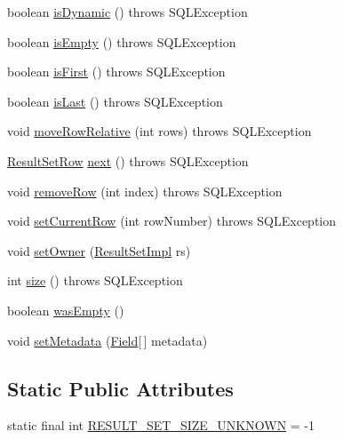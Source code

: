 \begin{DoxyCompactItemize}
\item 
boolean \mbox{\hyperlink{interfacecom_1_1mysql_1_1jdbc_1_1_row_data_a0205c4297c795afb968d714a56272e01}{is\+Dynamic}} ()  throws S\+Q\+L\+Exception
\item 
boolean \mbox{\hyperlink{interfacecom_1_1mysql_1_1jdbc_1_1_row_data_afe25c16468d9db9d9458db7b1c6004f1}{is\+Empty}} ()  throws S\+Q\+L\+Exception
\item 
boolean \mbox{\hyperlink{interfacecom_1_1mysql_1_1jdbc_1_1_row_data_a4bcee2924cecb7f100d887963d6b5b70}{is\+First}} ()  throws S\+Q\+L\+Exception
\item 
boolean \mbox{\hyperlink{interfacecom_1_1mysql_1_1jdbc_1_1_row_data_a372c70885e7272deb3ad84fefb75eebb}{is\+Last}} ()  throws S\+Q\+L\+Exception
\item 
void \mbox{\hyperlink{interfacecom_1_1mysql_1_1jdbc_1_1_row_data_ad0ef1f79fa19fbd533c4e1bfbabd7316}{move\+Row\+Relative}} (int rows)  throws S\+Q\+L\+Exception
\item 
\mbox{\hyperlink{classcom_1_1mysql_1_1jdbc_1_1_result_set_row}{Result\+Set\+Row}} \mbox{\hyperlink{interfacecom_1_1mysql_1_1jdbc_1_1_row_data_a1984eb77a7be765f3da79a1e2349af59}{next}} ()  throws S\+Q\+L\+Exception
\item 
void \mbox{\hyperlink{interfacecom_1_1mysql_1_1jdbc_1_1_row_data_ac60b2e20cd7043fb730f0977386e80be}{remove\+Row}} (int index)  throws S\+Q\+L\+Exception
\item 
void \mbox{\hyperlink{interfacecom_1_1mysql_1_1jdbc_1_1_row_data_af1db64feefc1ecf2db53a72ec6063839}{set\+Current\+Row}} (int row\+Number)  throws S\+Q\+L\+Exception
\item 
void \mbox{\hyperlink{interfacecom_1_1mysql_1_1jdbc_1_1_row_data_ad2c7f5220e0bd60681453d3d294607cc}{set\+Owner}} (\mbox{\hyperlink{classcom_1_1mysql_1_1jdbc_1_1_result_set_impl}{Result\+Set\+Impl}} rs)
\item 
int \mbox{\hyperlink{interfacecom_1_1mysql_1_1jdbc_1_1_row_data_a7c6f91ddc0fcd7f5f12a64c7dc019995}{size}} ()  throws S\+Q\+L\+Exception
\item 
boolean \mbox{\hyperlink{interfacecom_1_1mysql_1_1jdbc_1_1_row_data_a27df2f8d51aad5e69a5ac330a7b70aac}{was\+Empty}} ()
\item 
void \mbox{\hyperlink{interfacecom_1_1mysql_1_1jdbc_1_1_row_data_a4504dda637ff2fc39d8f19439fff8777}{set\+Metadata}} (\mbox{\hyperlink{classcom_1_1mysql_1_1jdbc_1_1_field}{Field}}\mbox{[}$\,$\mbox{]} metadata)
\end{DoxyCompactItemize}
\subsection*{Static Public Attributes}
\begin{DoxyCompactItemize}
\item 
static final int \mbox{\hyperlink{interfacecom_1_1mysql_1_1jdbc_1_1_row_data_a4814df22c9fba39504546b316117c83c}{R\+E\+S\+U\+L\+T\+\_\+\+S\+E\+T\+\_\+\+S\+I\+Z\+E\+\_\+\+U\+N\+K\+N\+O\+WN}} = -\/1
\end{DoxyCompactItemize}


